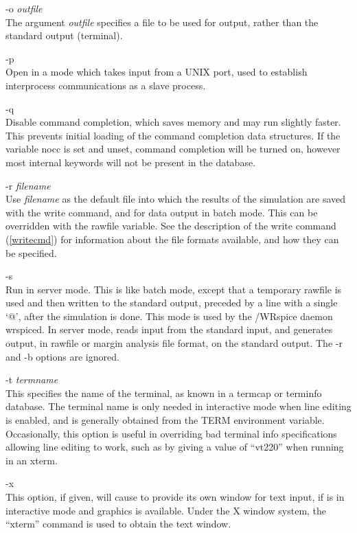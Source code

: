 \begin{description}
\item{\vt -o} {\it outfile}\\
The argument {\it outfile\/} specifies a file to be used for output,
rather than the standard output (terminal).

\item{\vt -p}\\
Open {\WRspice} in a mode which takes input from a UNIX port, used to
establish interprocess communications as a slave process.

\item{\vt -q}\\
Disable command completion, which saves memory and may run slightly
faster.  This prevents initial loading of the command completion data
structures.  If the variable {\et nocc} is set and unset, command
completion will be turned on, however most internal keywords will not
be present in the database.

\item{\vt -r} {\it filename}\\
Use {\it filename\/} as the default file into which the results of the
simulation are saved with the {\cb write} command, and for data output
in batch mode.  This can be overridden with the {\et rawfile}
variable.  See the description of the {\cb write} command
(\ref{writecmd}) for information about the file formats available, and
how they can be specified.

\item{\vt -s}\\
Run in server mode.  This is like batch mode, except that a temporary
rawfile is used and then written to the standard output, preceded by a
line with a single `{\vt @}', after the simulation is done.  This mode
is used by the {/WRspice} daemon {\vt wrspiced}.  In server mode,
{\WRspice} reads input from the standard input, and generates output,
in rawfile or margin analysis file format, on the standard output. 
The {\vt -r} and {\vt -b} options are ignored.

\item{{\vt -t} {\it termname}}\\
This specifies the name of the terminal, as known in a termcap or
terminfo database.  The terminal name is only needed in interactive
mode when line editing is enabled, and is generally obtained from the
{\et TERM} environment variable.  Occasionally, this option is useful
in overriding bad terminal info specifications allowing line editing
to work, such as by giving a value of ``{\vt vt220}'' when running in
an {\vt xterm}.

\item{\vt -x}\\
This option, if given, will cause {\WRspice} to provide its own window
for text input, if {\WRspice} is in interactive mode and graphics is
available.  Under the X window system, the ``{\vt xterm}'' command
is used to obtain the text window.
\end{description}

